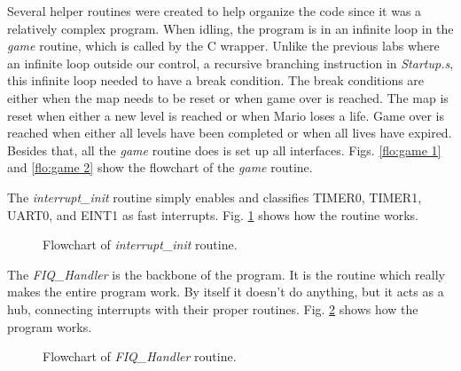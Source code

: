 \documentclass[letterpaper,10pt]{article}
\begin{document}
    Several helper routines were created to help organize the code since it
    was a relatively complex program. When idling, the program is in an
    infinite loop in the \textit{game} routine, which is called by the C
    wrapper. Unlike the previous labs where an infinite loop outside our
    control, a recursive branching instruction in \textit{Startup.s}, this 
    infinite loop needed to have a break condition. The break conditions are
    either when the map needs to be reset or when game over is reached. The map
    is reset when either a new level is reached or when Mario loses a life.
    Game over is reached when either all levels have been completed or when all
    lives have expired. Besides that, all the \textit{game} routine does is
    set up all interfaces. Figs. \ref{flo:game 1} and \ref{flo:game 2} show
    the flowchart of the \textit{game} routine.

    \begin{minipage}{\linewidth}
        
        \label{flo:game 1}
    \end{minipage}

    \begin{minipage}{\linewidth}
        
        \label{flo:game 2}
    \end{minipage}

    The \textit{interrupt\_init} routine simply enables and classifies TIMER0,
    TIMER1, UART0, and EINT1 as fast interrupts. Fig. \ref{flo:interrupt_init}
    shows how the routine works.

    \begin{figure}[hp]
        
        \caption{Flowchart of \textit{interrupt\_init} routine.}
        \label{flo:interrupt_init}
    \end{figure}

    The \textit{FIQ\_Handler} is the backbone of the program. It is the routine
    which really makes the entire program work. By itself it doesn't do anything,
    but it acts as a hub, connecting interrupts with their proper routines. Fig.
    \ref{flo:fiq_handler} shows how the program works.

    \begin{figure}[hp]
        
        \caption{Flowchart of \textit{FIQ\_Handler} routine.}
        \label{flo:fiq_handler}
    \end{figure}
\end{document}
